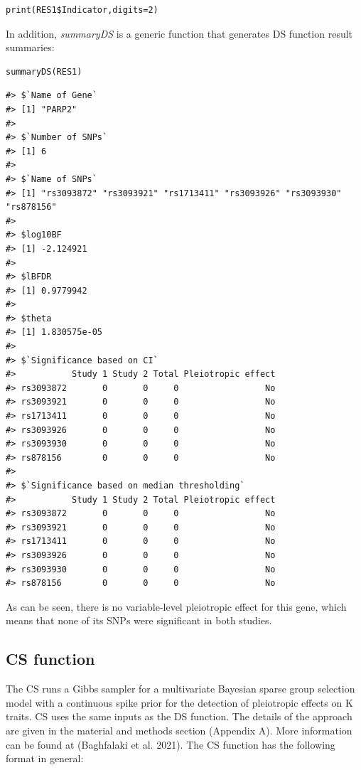 \begin{verbatim}
print(RES1$Indicator,digits=2)
\end{verbatim}

In addition, \emph{summaryDS} is a generic function that generates DS function result summaries:

\begin{verbatim}
summaryDS(RES1)
\end{verbatim}

\begin{verbatim}
#> $`Name of Gene`
#> [1] "PARP2"
#> 
#> $`Number of SNPs`
#> [1] 6
#> 
#> $`Name of SNPs`
#> [1] "rs3093872" "rs3093921" "rs1713411" "rs3093926" "rs3093930" "rs878156" 
#> 
#> $log10BF
#> [1] -2.124921
#> 
#> $lBFDR
#> [1] 0.9779942
#> 
#> $theta
#> [1] 1.830575e-05
#> 
#> $`Significance based on CI`
#>           Study 1 Study 2 Total Pleiotropic effect
#> rs3093872       0       0     0                 No
#> rs3093921       0       0     0                 No
#> rs1713411       0       0     0                 No
#> rs3093926       0       0     0                 No
#> rs3093930       0       0     0                 No
#> rs878156        0       0     0                 No
#> 
#> $`Significance based on median thresholding`
#>           Study 1 Study 2 Total Pleiotropic effect
#> rs3093872       0       0     0                 No
#> rs3093921       0       0     0                 No
#> rs1713411       0       0     0                 No
#> rs3093926       0       0     0                 No
#> rs3093930       0       0     0                 No
#> rs878156        0       0     0                 No
\end{verbatim}

As can be seen, there is no variable-level pleiotropic effect for this gene, which means that none of its SNPs were significant in both studies.

\hypertarget{cs-function}{%
\subsection{CS function}\label{cs-function}}

The CS runs a Gibbs sampler for a multivariate Bayesian sparse group selection model with a continuous spike prior for the detection of pleiotropic effects on K traits. CS uses the same inputs as the DS function.
The details of the approach are given in the material and methods section (Appendix A). More information can be found at (Baghfalaki et al. 2021).
The CS function has the following format in general:

